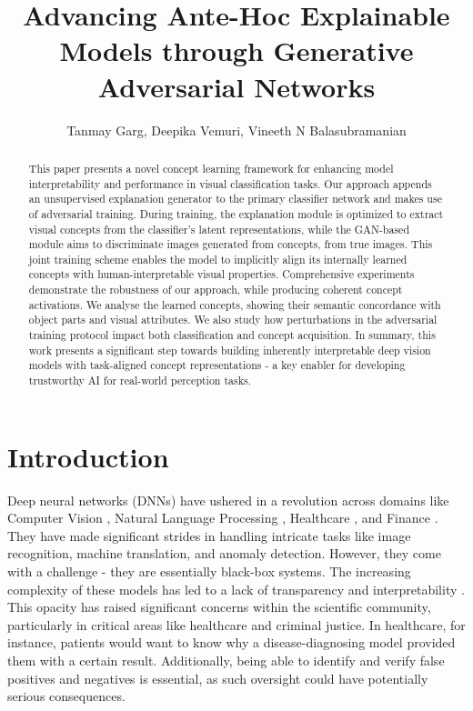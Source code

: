 \documentclass[letterpaper]{article}
\title{Advancing Ante-Hoc Explainable Models through Generative Adversarial Networks}
\author {
    Tanmay Garg,
    Deepika Vemuri,
    Vineeth N Balasubramanian
}
\begin{document}
\maketitle



\begin{abstract}

This paper presents a novel concept learning framework for enhancing model interpretability and performance in visual classification tasks. Our approach appends an unsupervised explanation generator to the primary classifier network and makes use of adversarial training. During training, the explanation module is optimized to extract visual concepts from the classifier's latent representations, while the GAN-based module aims to discriminate images generated from concepts, from true images. This joint training scheme enables the model to implicitly align its internally learned concepts with human-interpretable visual properties. Comprehensive experiments demonstrate the robustness of our approach, while producing coherent concept activations. We analyse the learned concepts, showing their semantic concordance with object parts and visual attributes. We also study how perturbations in the adversarial training protocol impact both classification and concept acquisition.
In summary, this work presents a significant step towards building inherently interpretable deep vision models with task-aligned concept representations - a key enabler for developing trustworthy AI for real-world perception tasks.

\end{abstract}



\maketitle
\section{Introduction}\label{sec:intro}

Deep neural networks (DNNs) have ushered in a revolution across domains like Computer Vision \cite{VGG}, Natural Language Processing \cite{gpt3}, Healthcare \cite{health}, and Finance \cite{finance}. They have made significant strides in handling intricate tasks like image recognition, machine translation, and anomaly detection. However, they come with a challenge - they are essentially black-box systems. The increasing complexity of these models has led to a lack of transparency and interpretability \cite{lipton, ravikumar}. This opacity has raised significant concerns within the scientific community, particularly in critical areas like healthcare and criminal justice. In healthcare, for instance, patients would want to know why a disease-diagnosing model provided them with a certain result.
Additionally, being able to identify and verify false positives and negatives is essential, as such oversight could have potentially serious consequences.
\end{document}
